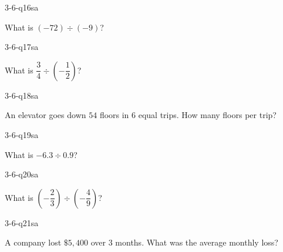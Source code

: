 
\begin{practiceQuestion}{3-6-q16}{sa}
\begin{questionText}
What is $(-72) \div (-9)$?
\end{questionText}
\end{practiceQuestion}

\begin{practiceQuestion}{3-6-q17}{sa}
\begin{questionText}
What is $\dfrac{3}{4} \div \left(-\dfrac{1}{2}\right)$?
\end{questionText}
\end{practiceQuestion}

\begin{practiceQuestion}{3-6-q18}{sa}
\begin{questionText}
An elevator goes down $54$ floors in $6$ equal trips. How many floors per trip?
\end{questionText}
\end{practiceQuestion}

\begin{practiceQuestion}{3-6-q19}{sa}
\begin{questionText}
What is $-6.3 \div 0.9$?
\end{questionText}
\end{practiceQuestion}

\begin{practiceQuestion}{3-6-q20}{sa}
\begin{questionText}
What is $\left(-\dfrac{2}{3}\right) \div \left(-\dfrac{4}{9}\right)$?
\end{questionText}
\end{practiceQuestion}

\begin{practiceQuestion}{3-6-q21}{sa}
\begin{questionText}
A company lost $\$5{,}400$ over $3$ months. What was the average monthly loss?
\end{questionText}
\end{practiceQuestion}

